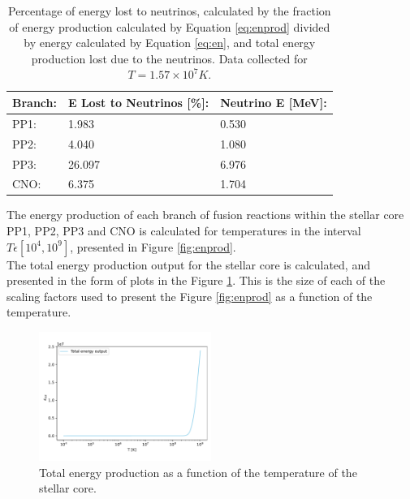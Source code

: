\documentclass[10pt, nofootinbib, twocolumn]{revtex4-1}
\begin{document}
\begin{table}[H]
\caption{Percentage of energy lost to neutrinos, calculated by the fraction of energy production calculated by Equation \eqref{eq:enprod} divided by energy calculated by Equation \eqref{eq:en}, and total energy production lost due to the neutrinos. Data collected for $T=1.57\times10^7K$.}
    \begin{tabular*}{0.5\textwidth}{@{\extracolsep{\fill}}lll}
    \textbf{Branch:}   & \textbf{E Lost to Neutrinos [\%]:} & \textbf{Neutrino E [MeV]:} \\
    \midrule
    PP1: & 1.983 & 0.530 \\
    PP2: & 4.040 & 1.080 \\
    PP3: & 26.097& 6.976 \\
    CNO: & 6.375 & 1.704 \\
    \end{tabular*}
    \label{tab:neu}
\end{table}

The energy production of each branch of fusion reactions within the stellar core PP1, PP2, PP3 and CNO is calculated for temperatures in the interval $T\epsilon [10^4,10^9]$, presented in Figure \ref{fig:enprod}. \\

The total energy production output for the stellar core is calculated, and presented in the form of plots in the Figure \ref{fig:tot}. This is the size of each of the scaling factors used to present the Figure \ref{fig:enprod} as a function of the temperature.
\begin{figure}[H]
    \centering
    \includegraphics[width = 0.5\textwidth]{figures/energy_tot.pdf} 
    \caption{Total energy production as a function of the temperature of the stellar core.}
    \label{fig:tot}
\end{figure} 
\end{document}
